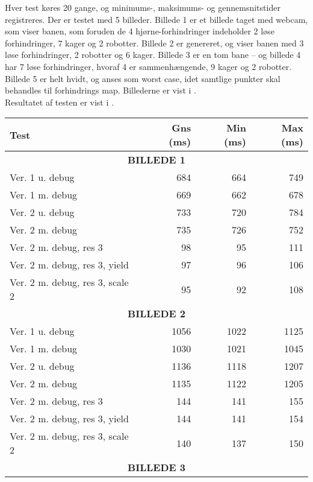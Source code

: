 Hver test køres 20 gange, og minimums-, maksimums- og gennemsnitstider registreres. Der er testet med 5 billeder. Billede 1 er et billede taget med webcam, som viser banen, som foruden de 4 hjørne-forhindringer indeholder 2 løse forhindringer, 7 kager og 2 robotter. Billede 2 er genereret, og viser banen med 3 løse forhindringer, 2 robotter og 6 kager. Billede 3 er en tom bane -- og billede 4 har 7 løse forhindringer, hvoraf 4 er sammenhængende, 9 kager og 2 robotter. Billede 5 er helt hvidt, og anses som worst case, idet samtlige punkter skal behandles til forhindrings map. Billederne er vist i .\\
Resultatet af testen er vist i .
\begin{table}[!hp]
	\begin{center}
	\begin{tabular}{l | r r r}
		\textbf{Test} & \textbf{Gns (ms)} & \textbf{Min (ms)} & \textbf{Max (ms)} \\
		\hline
		\multicolumn{4}{c}{\textbf{BILLEDE 1}}\\
		\hline
		Ver. 1 u. debug & 684 & 664 & 749 \\
		Ver. 1 m. debug & 669 & 662 & 678 \\
		Ver. 2 u. debug & 733 & 720 & 784 \\
		Ver. 2 m. debug & 735 & 726 & 752 \\
		Ver. 2 m. debug, res 3 & 98 & 95 & 111 \\
		Ver. 2 m. debug, res 3, yield & 97 & 96 & 106 \\
		Ver. 2 m. debug, res 3, scale 2 & 95 & 92 & 108 \\
		\hline
		\multicolumn{4}{c}{\textbf{BILLEDE 2}}\\
		\hline
		Ver. 1 u. debug & 1056 & 1022 & 1125 \\
		Ver. 1 m. debug & 1030 & 1021 & 1045 \\
		Ver. 2 u. debug & 1136 & 1118 & 1207 \\
		Ver. 2 m. debug & 1135 & 1122 & 1205 \\
		Ver. 2 m. debug, res 3 & 144 & 141 & 155 \\
		Ver. 2 m. debug, res 3, yield & 144 & 141 & 154 \\
		Ver. 2 m. debug, res 3, scale 2 & 140 & 137 & 150 \\ 
		\hline
		\multicolumn{4}{c}{\textbf{BILLEDE 3}}\\

\end{tabular}
\end{center}
\end{table}
